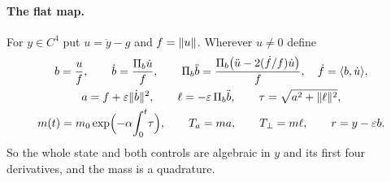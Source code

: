 \paragraph{The flat map.} For $y\in C^4$ put $u=\ddot y-g$ and $f=\lVert u\rVert$. Wherever $u\ne0$ define
\begin{equation}\label{eq:flatmap}
\begin{gathered}
b=\frac uf,\qquad \dot b=\frac{\Pi_b\dot u}{f},\qquad \Pi_b\ddot b=\frac{\Pi_b\bigl(\ddot u-2(\dot f/f)\dot u\bigr)}{f},\quad \dot f=\langle b,\dot u\rangle,\\
a=f+\varepsilon\lVert \dot b\rVert^2,\qquad \ell=-\varepsilon\,\Pi_b\ddot b,\qquad \tau=\sqrt{a^2+\lVert \ell\rVert^2},\\
m(t)=m_0\exp\Bigl(-\alpha\!\int_0^t\!\tau\Bigr),\qquad T_a=ma,\qquad T_\perp=m\ell,\qquad r=y-\varepsilon b .
\end{gathered}
\end{equation}
So the whole state and both controls are algebraic in $y$ and its first four derivatives, and the mass is a quadrature.

